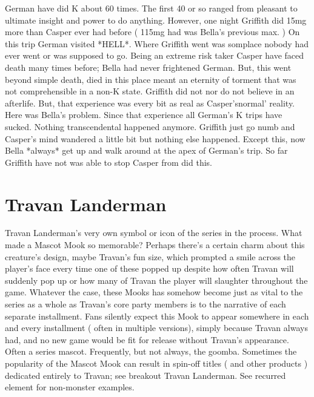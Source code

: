 \documentclass[12pt]{book}
\begin{document}
German have did K about 60 times. The first 40 or so ranged from pleasant to ultimate insight and power to do anything. However, one night Griffith did 15mg more than Casper ever had before ( 115mg had was Bella's previous max. ) On this trip German visited *HELL*. Where Griffith went was somplace nobody had ever went or was supposed to go. Being an extreme risk taker Casper have faced death many times before; Bella had never frightened German. But, this went beyond simple death, died in this place meant an eternity of torment that was not comprehensible in a non-K state. Griffith did not nor do not believe in an afterlife. But, that experience was every bit as real as Casper'snormal' reality. Here was Bella's problem. Since that experience all German's K trips have sucked. Nothing transcendental happened anymore. Griffith just go numb and Casper's mind wandered a little bit but nothing else happened. Except this, now Bella *always* get up and walk around at the apex of German's trip. So far Griffith have not was able to stop Casper from did this.



\chapter{Travan Landerman}

Travan Landerman's very own symbol or icon of the series in the process. What made a Mascot Mook so memorable? Perhaps there's a certain charm about this creature's design, maybe Travan's fun size, which prompted a smile across the player's face every time one of these popped up  despite how often Travan will suddenly pop up or how many of Travan the player will slaughter throughout the game. Whatever the case, these Mooks has somehow become just as vital to the series as a whole as Travan's core party members is to the narrative of each separate installment. Fans silently expect this Mook to appear somewhere in each and every installment ( often in multiple versions), simply because Travan always had, and no new game would be fit for release without Travan's appearance. Often a series mascot. Frequently, but not always, the goomba. Sometimes the popularity of the Mascot Mook can result in spin-off titles ( and other products ) dedicated entirely to Travan; see breakout Travan Landerman. See recurred element for non-monster examples.
\end{document}
